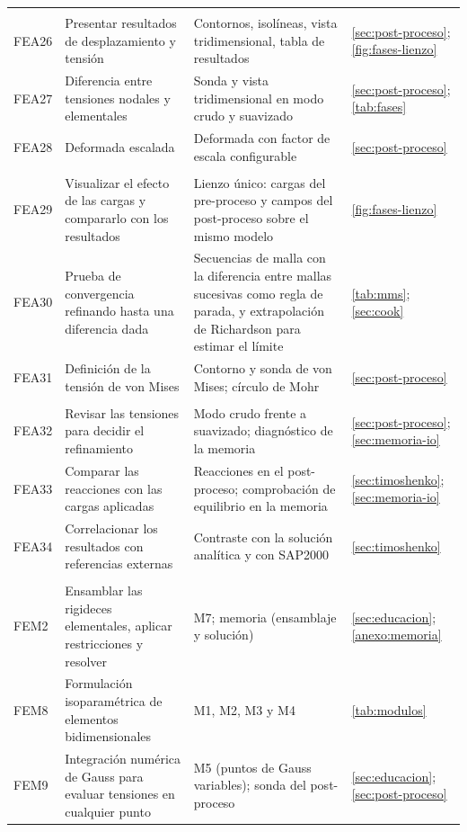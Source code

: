 {\begin{longtable}{@{}>{\raggedright\arraybackslash}p{1.3cm}>{\raggedright\arraybackslash}p{5.3cm}>{\raggedright\arraybackslash}p{5.2cm}>{\raggedright\arraybackslash}p{2.6cm}@{}}
\multicolumn{4}{@{}l}{\emph{Post-proceso}} \\
FEA26 & Presentar resultados de desplazamiento y tensión & Contornos, isolíneas, vista tridimensional, tabla de resultados & \autoref{sec:post-proceso}; \autoref{fig:fases-lienzo} \\
FEA27 & Diferencia entre tensiones nodales y elementales & Sonda y vista tridimensional en modo crudo y suavizado & \autoref{sec:post-proceso}; \autoref{tab:fases} \\
FEA28 & Deformada escalada & Deformada con factor de escala configurable & \autoref{sec:post-proceso} \\
\multicolumn{4}{@{}l}{\emph{Conceptos fundamentales}} \\
FEA29 & Visualizar el efecto de las cargas y compararlo con los resultados & Lienzo único: cargas del pre-proceso y campos del post-proceso sobre el mismo modelo & \autoref{fig:fases-lienzo} \\
FEA30 & Prueba de convergencia refinando hasta una diferencia dada & Secuencias de malla con la diferencia entre mallas sucesivas como regla de parada, y extrapolación de Richardson para estimar el límite & \autoref{tab:mms}; \autoref{sec:cook} \\
FEA31 & Definición de la tensión de von Mises & Contorno y sonda de von Mises; círculo de Mohr & \autoref{sec:post-proceso} \\
\multicolumn{4}{@{}l}{\emph{Verificación y validación}} \\
FEA32 & Revisar las tensiones para decidir el refinamiento & Modo crudo frente a suavizado; diagnóstico de la memoria & \autoref{sec:post-proceso}; \autoref{sec:memoria-io} \\
FEA33 & Comparar las reacciones con las cargas aplicadas & Reacciones en el post-proceso; comprobación de equilibrio en la memoria & \autoref{sec:timoshenko}; \autoref{sec:memoria-io} \\
FEA34 & Correlacionar los resultados con referencias externas & Contraste con la solución analítica y con SAP2000 & \autoref{sec:timoshenko} \\
\multicolumn{4}{@{}l}{\emph{Conceptos teóricos del procedimiento}} \\
FEM2 & Ensamblar las rigideces elementales, aplicar restricciones y resolver & M7; memoria (ensamblaje y solución) & \autoref{sec:educacion}; \autoref{anexo:memoria} \\
FEM8 & Formulación isoparamétrica de elementos bidimensionales & M1, M2, M3 y M4 & \autoref{tab:modulos} \\
FEM9 & Integración numérica de Gauss para evaluar tensiones en cualquier punto & M5 (puntos de Gauss variables); sonda del post-proceso & \autoref{sec:educacion}; \autoref{sec:post-proceso} \\
\end{longtable}}
